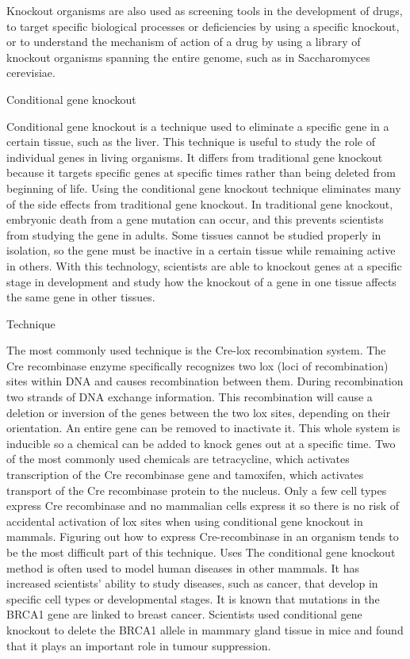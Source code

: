 Knockout organisms are also used as screening tools in the development of drugs, to target specific biological processes or deficiencies by using a specific knockout, or to understand the mechanism of action of a drug by using a library of knockout organisms spanning the entire genome, such as in Saccharomyces cerevisiae.

Conditional gene knockout

Conditional gene knockout is a technique used to eliminate a specific gene in a certain tissue, such as the liver. This technique is useful to study the role of individual genes in living organisms. It differs from traditional gene knockout because it targets specific genes at specific times rather than being deleted from beginning of life. Using the conditional gene knockout technique eliminates many of the side effects from traditional gene knockout. In traditional gene knockout, embryonic death from a gene mutation can occur, and this prevents scientists from studying the gene in adults. Some tissues cannot be studied properly in isolation, so the gene must be inactive in a certain tissue while remaining active in others. With this technology, scientists are able to knockout genes at a specific stage in development and study how the knockout of a gene in one tissue affects the same gene in other tissues.

Technique

The most commonly used technique is the Cre-lox recombination system. The Cre recombinase enzyme specifically recognizes two lox (loci of recombination) sites within DNA and causes recombination between them. During recombination two strands of DNA exchange information. This recombination will cause a deletion or inversion of the genes between the two lox sites, depending on their orientation. An entire gene can be removed to inactivate it. This whole system is inducible so a chemical can be added to knock genes out at a specific time. Two of the most commonly used chemicals are tetracycline, which activates transcription of the Cre recombinase gene and tamoxifen, which activates transport of the Cre recombinase protein to the nucleus. Only a few cell types express Cre recombinase and no mammalian cells express it so there is no risk of accidental activation of lox sites when using conditional gene knockout in mammals. Figuring out how to express Cre-recombinase in an organism tends to be the most difficult part of this technique.
Uses
The conditional gene knockout method is often used to model human diseases in other mammals. It has increased scientists' ability to study diseases, such as cancer, that develop in specific cell types or developmental stages. It is known that mutations in the BRCA1 gene are linked to breast cancer. Scientists used conditional gene knockout to delete the BRCA1 allele in mammary gland tissue in mice and found that it plays an important role in tumour suppression.

